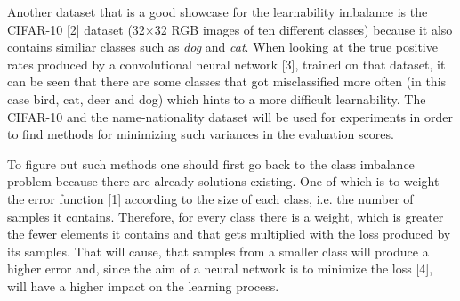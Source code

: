\documentclass[journal]{IEEEtran}
\begin{document}
Another dataset that is a good showcase for the learnability imbalance is the CIFAR-10 [2] dataset (32$\times$32 RGB images of ten different classes) because it also contains similiar classes such as \emph{dog} and \emph{cat}.
When looking at the true positive rates produced by a convolutional neural network [3], trained on that dataset, it can be seen that there are some classes that got misclassified more often (in this case bird, cat, deer and dog) which hints to a more difficult learnability. 
The CIFAR-10 and the name-nationality dataset will be used for experiments in order to find methods for minimizing such variances in the evaluation scores.



To figure out such methods one should first go back to the class imbalance problem because there are already solutions existing.
One of which is to weight the error function [1] according to the size of each class, i.e. the number of samples it contains.
Therefore, for every class there is a weight, which is greater the fewer elements it contains and that gets multiplied with the loss produced by its samples. %
That will cause, that samples from a smaller class will produce a higher error and, since the aim of a neural network is to minimize the loss [4], will have a higher impact on the learning process.
\end{document}
